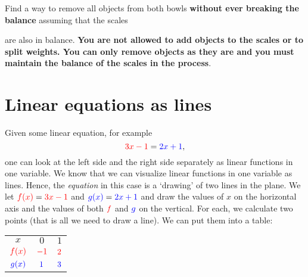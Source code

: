 \documentclass[a4paper,11pt]{article}
\newcommand{\tr}{\textcolor{red}}
\newcommand{\tb}{\textcolor{blue}}
\begin{document}
\begin{enumerate}[topsep=0pt,label=\arabic*.]
\begin{center}
 \end{center}
 Find a way to remove all objects from both bowls \textbf{without ever breaking
 the balance} assuming that the scales
 \begin{center}
 \end{center}
 are also in balance. \textbf{You are not allowed to add objects to the scales
 or to split weights. You can only remove objects as they are and you must
 maintain the balance of the scales in the process}.
\end{enumerate}

\section*{Linear equations as lines}

Given some linear equation, for example
\[
 \tr{3x - 1} = \tb{2x + 1},
\]
one can look at the left side and the right side separately as linear functions
in one variable. We know that we can visualize linear functions in one variable
as lines. Hence, the \emph{equation} in this case is a `drawing' of two lines in
the plane. We let $\tr{f(x)} = \tr{3x - 1}$ and $\tb{g(x)} = \tb{2x + 1}$ and
draw the values of $x$ on the horizontal axis and the values of both $\tr{f}$
and $\tb{g}$ on the vertical. For each, we calculate two points (that is all we
need to draw a line). We can put them into a table:

\begin{center}
 \begin{tabular}{c|cc}
  $x$ & $0$ & $1$\\
  \cmidrule{1-3}
  $\tr{f(x)}$ & $\tr{-1}$ & $\tr{2}$\\
  \cmidrule{1-3}
  $\tb{g(x)}$ & $\tb{1}$ & $\tb{3}$
 \end{tabular}
\end{center}
\end{document}
